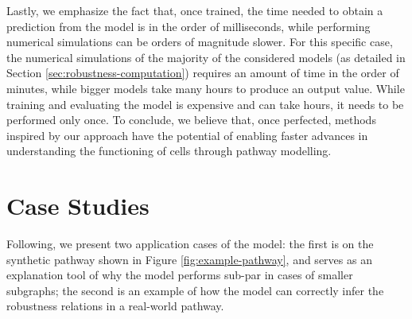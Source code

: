 Lastly, we emphasize the fact that, once trained, the time needed to obtain a prediction from the model is in the order of milliseconds, while performing numerical simulations can be orders of magnitude slower. For this specific case, the numerical simulations of the majority of the considered models (as detailed in Section \ref{sec:robustness-computation}) requires an amount of time in the order of minutes, while bigger models take many hours to produce an output value. While training and evaluating the model is expensive and can take hours, it needs to be performed only once. To conclude, we believe that, once perfected, methods inspired by our approach have the potential of enabling faster advances in understanding the functioning of cells through pathway modelling.

\section{Case Studies}
Following, we present two application cases of the model: the first is on the synthetic pathway shown in Figure \ref{fig:example-pathway}, and serves as an explanation tool of why the model performs sub-par in cases of smaller subgraphs; the second is an example of how the model can correctly infer the robustness relations in a real-world pathway.

